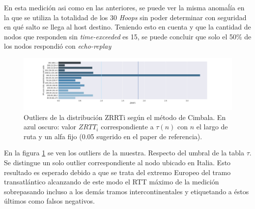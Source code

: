 En esta medición asi como en las anteriores, se puede ver la misma anomaĺía en la que se utiliza la totalidad de los 30 \emph{Hoops} sin poder determinar con seguridad en qué salto se llega al host destino. Teniendo esto en cuenta y que la cantidad de nodos que responden sin \emph{time-exceeded} es 15, se puede concluir que solo el 50\% de los nodos respondió con \emph{echo-replay}

 
\begin{figure}[H]
   \centering
       \includegraphics[width=1\textwidth, height=1\textheight, keepaspectratio]{../img/nuu-uz-zrtt}
 \caption{Outliers de la distribución ZRRTi según el método de Cimbala. En azul oscuro: valor $ZRTT_i$ correspondiente a $\tau(n)$ con $n$ el largo de ruta y un alfa fijo (0.05 sugerido en el paper de referencia).}
 \label{fig:nuu-uz-zrtt}
\end{figure}

En la figura \ref{fig:nuu-uz-zrtt} se ven los outliers de la muestra. Respecto del umbral de la tabla $\tau$. Se distingue un solo outlier correspondiente al nodo ubicado en Italia. Esto resultado es esperado debido a que se trata del extremo Europeo del tramo transatlántico alcanzando de este modo el RTT máximo de la medición sobrepasando incluso a los demás tramos intercontinentales y etiquetando a éstos últimos como falsos negativos. 